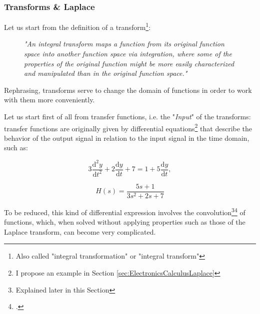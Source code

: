 \documentclass[a4paper, 10pt, final]{article} %
\newcommand{\parenciteit}[2]{\textit{\parencite[#1]{#2}}} %
\begin{document}
    \begin{samepage}%
        \subsubsection{Transforms \& Laplace} \label{sec:TransformsAndLaplace}
        Let us start from the definition of a transform\footnote{Also called "integral transformation" or "integral transform"}: \nopagebreak
        \begin{figure}[H]
            \Centering
            \vspace{1ex}
            \textit{"An integral transform maps a function from its original function space into another function space via integration, where some of the properties of the original function might be more easily characterized and manipulated than in the original function space." }

            \RaggedLeft
            \vspace{1ex}

            \scriptsize{\parenciteit{}{Transform:Wiki}}
            \vspace{1ex}
        \end{figure}
        \noindent Rephrasing, transforms serve to change the domain of functions in order to work with them more conveniently.
    \end{samepage}%

    \begin{samepage}%
        Let us start first of all from transfer functions, i.e. the "\emph{Input}" of the transforms: transfer functions are originally given by differential equations\footnote{I propose an example in Section \ref{sec:ElectronicsCalculusLaplace}} that describe the behavior of the output signal in relation to the input signal in the time domain, such as:
        \begin{figure}[H]
            \centering
            \begin{minipage}[b]{.3\linewidth}
                \centering
                \[
                    3\frac{\mathrm{d}^2y}{\mathrm{d}t^2} + 2\frac{\mathrm{d}y}{\mathrm{d}t} + 7 = 1 + 5\frac{\mathrm{d}y}{\mathrm{d}t} \mathrm{,}
                \]
            \end{minipage}
            \hspace{0.04\linewidth}
            \begin{minipage}[b]{.3\linewidth}
                \centering
                \[
                    H(s) = \frac{5s + 1}{3s^2 + 2s + 7}
                \]
            \end{minipage}
        \end{figure}
        \noindent To be reduced, this kind of differential expression involves the convolution\footnote{Explained later in this Section}\:\footcite[]{Convolution:Wiki} of functions, which, when solved without applying properties such as those of the Laplace transform, can become very complicated.
    \end{samepage}%
\end{document}
